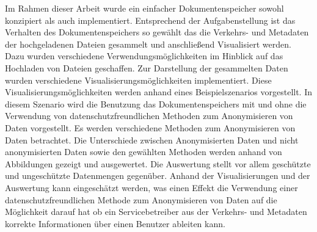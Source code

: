\documentclass[
    fontsize=12pt,
    headings=small,
    parskip=half,           %
    bibliography=totoc,
    numbers=noenddot,       %
    open=any,               %
    ]{scrreprt}
\begin{document}
Im Rahmen dieser Arbeit wurde ein einfacher Dokumentenspeicher sowohl konzipiert als auch implementiert.
Entsprechend der Aufgabenstellung ist das Verhalten des Dokumentenspeichers so gewählt das die Verkehrs- und Metadaten der hochgeladenen Dateien gesammelt und anschließend Visualisiert werden.
Dazu wurden verschiedene Verwendungsmöglichkeiten im Hinblick auf das Hochladen von Dateien geschaffen.
Zur Darstellung der gesammelten Daten wurden verschiedene Visualisierungsmöglichkeiten implementiert.
Diese Visualisierungsmöglichkeiten werden anhand eines Beispielszenarios vorgestellt.
In diesem Szenario wird die Benutzung das Dokumentenspeichers mit und ohne die Verwendung von datenschutzfreundlichen Methoden zum Anonymisieren von Daten vorgestellt.
Es werden verschiedene Methoden zum Anonymisieren von Daten betrachtet.
Die Unterschiede zwischen Anonymisierten Daten und nicht anonymisierten Daten sowie den gewählten Methoden werden anhand von Abbildungen gezeigt und ausgewertet.
Die Auswertung stellt vor allem geschützte und ungeschützte Datenmengen gegenüber.
Anhand der Visualisierungen und der Auswertung kann eingeschätzt werden, was einen Effekt die Verwendung einer datenschutzfreundlichen Methode zum Anonymisieren von Daten auf die Möglichkeit darauf hat ob ein Servicebetreiber aus der Verkehrs- und Metadaten korrekte Informationen über einen Benutzer ableiten kann.
\end{document}
